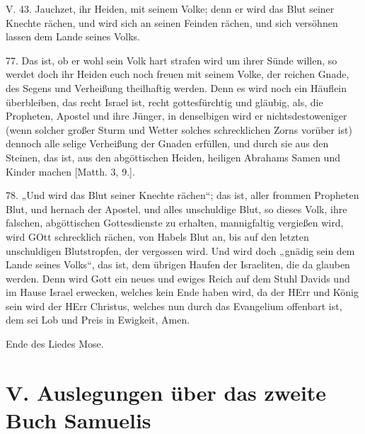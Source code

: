 \begin{schriftzitat}
V. 43. Jauchzet, ihr Heiden, mit seinem Volke; denn er wird das Blut seiner Knechte rächen, und wird sich an seinen Feinden rächen, und sich versöhnen lassen dem Lande seines Volks.
\end{schriftzitat}

77. Das ist, ob er wohl sein Volk hart strafen wird um ihrer Sünde willen, so werdet doch ihr Heiden euch noch freuen mit seinem Volke, der reichen Gnade, des Segens und Verheißung theilhaftig werden. Denn es wird noch ein Häuflein überbleiben, das recht Israel ist, recht gottesfürchtig und gläubig, als, die Propheten, Apostel und ihre Jünger, in denselbigen wird er nichtsdestoweniger (wenn solcher großer Sturm und Wetter solches schrecklichen Zorns vorüber ist) dennoch alle selige Verheißung der Gnaden erfüllen, und durch sie aus den Steinen, das ist, aus den abgöttischen Heiden, heiligen Abrahams Samen und Kinder machen [Matth. 3, 9.].

78. „Und wird das Blut seiner Knechte rächen“; das ist, aller frommen Propheten Blut, und hernach der Apostel, und alles unschuldige Blut, so dieses Volk, ihre falschen, abgöttischen Gottesdienste zu erhalten, mannigfaltig vergießen wird, wird GOtt schrecklich rächen, von Habels Blut an, bis auf den letzten unschuldigen Blutstropfen, der vergossen wird. Und wird doch „gnädig sein dem Lande seines Volks“, das ist, dem übrigen Haufen der Israeliten, die da glauben werden. Denn wird Gott ein neues und ewiges Reich auf dem Stuhl Davids und im Hause Israel erwecken, welches kein Ende haben wird, da der HErr und König sein wird der HErr Christus, welches nun durch das Evangelium offenbart ist, dem sei Lob und Preis in Ewigkeit, Amen.

Ende des Liedes Mose.

\part{V. Auslegungen über das zweite Buch Samuelis}

